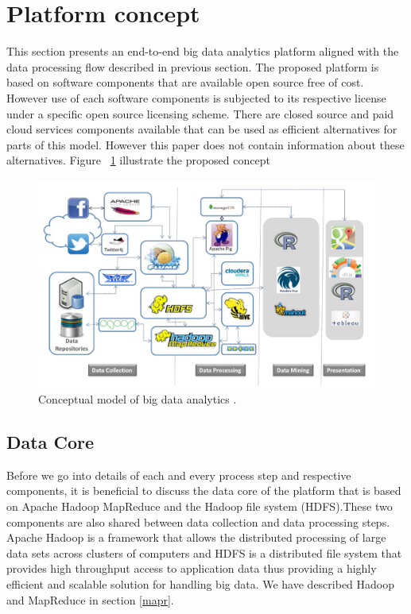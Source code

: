  \section{Platform concept}
 This section presents an end-to-end big data analytics platform aligned with the data processing flow described in previous section. The proposed platform is based on software components that are available open source free of cost. However use of each software components is subjected to its respective license under a specific open source licensing scheme. There are closed source and paid cloud services components available that can be used as efficient alternatives for parts of this model. However this paper does not contain information about these alternatives. Figure ~\ref{fig:cplatform} illustrate the proposed concept
 \begin{figure}[!h]
    \begin{center}
      \includegraphics[width=\textwidth]{images/cplatform.pdf}
      \caption{Conceptual model of big data analytics .}
      \label{fig:cplatform}
    \end{center}
  \end{figure} 
\subsection{Data Core}
Before we go into details of each and every process step and respective components, it is beneficial to discuss the data core of the platform that is based on Apache Hadoop MapReduce and the Hadoop file system (HDFS).These two components are also shared between data collection and data processing steps.  Apache Hadoop is a framework that allows the distributed processing of large data sets across clusters of computers and HDFS is a distributed file system that provides high throughput access to application data\cite{apachehadoop} thus providing a highly efficient and scalable solution for handling big data. We have described Hadoop and MapReduce in section \ref{mapr}.
